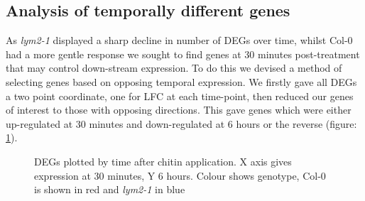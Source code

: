 \documentclass[../main.tex]{subfiles}
\begin{document}
\subsection{Analysis of temporally different genes}

As \textit{lym2-1} displayed a sharp decline in number of DEGs over time, whilst Col-0 had
a more gentle response we sought to find genes at 30 minutes
post-treatment that may control down-stream expression. To do this we devised a
method of selecting genes based on opposing temporal expression. We firstly gave
all DEGs a two point coordinate, one for LFC at each time-point, then reduced
our genes of interest to those with opposing directions. This gave genes which
were either up-regulated at 30 minutes and down-regulated at 6 hours or the
reverse (figure: \ref{fig:diverg}).


\begin{figure}[!ht]
  \centering
  \caption[Differential genes plotted by expression at two time points]{DEGs plotted by time after chitin application. X axis gives
    expression at 30 minutes, Y 6 hours. Colour shows genotype, Col-0 is shown
    in red and \textit{lym2-1} in blue}
  \label{fig:diverg}
\end{figure}
\end{document}
